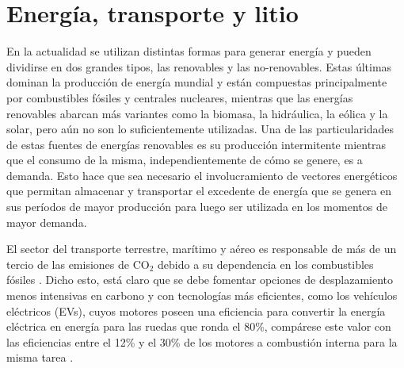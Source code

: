 \section{Energía, transporte y litio}

En la actualidad se utilizan distintas formas para generar energía y pueden 
dividirse en dos grandes tipos, las renovables y las no-renovables. Estas últimas
dominan la producción de energía mundial y están compuestas principalmente por 
combustibles fósiles y centrales nucleares, mientras que las energías renovables
abarcan más variantes como la biomasa, la hidráulica, la eólica y la solar, pero 
aún no son lo suficientemente utilizadas. Una de las particularidades de estas 
fuentes de energías renovables es su producción intermitente mientras que el 
consumo de la misma, independientemente de cómo se genere, es a demanda. Esto 
hace que sea necesario el involucramiento de vectores energéticos que permitan 
almacenar y transportar el excedente de energía que se genera en sus períodos de 
mayor producción para luego ser utilizada en los momentos de mayor demanda.

El sector del transporte terrestre, marítimo y aéreo es responsable de más de un 
tercio de las emisiones de CO$_2$ debido a su dependencia en los combustibles 
fósiles \cite{IEA}. Dicho esto, está claro que se debe fomentar opciones de desplazamiento menos intensivas
en carbono y con tecnologías más eficientes, como los vehículos eléctricos (EVs),
cuyos motores poseen una eficiencia para convertir la energía eléctrica en energía para las ruedas que ronda el 80\%, compárese este valor con las
eficiencias entre el 12\% y el 30\% de los motores a combustión interna para la misma tarea \cite{DOE}.

